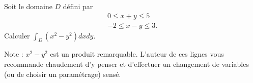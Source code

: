 
\begin{exercice}\label{exoOutilsMath-0142}

    Soit le domaine \( D\) défini par
    \begin{subequations}
        \begin{align}
            0\leq x+y\leq 5\\
            -2\leq x-y\leq 3.
        \end{align}
    \end{subequations}
    Calculer \( \int_D(x^2-y^2)dxdy\).

    Note : \( x^2-y^2\) est un produit remarquable. L'auteur de ces lignes vous recommande chaudement d'y penser et d'effectuer un changement de variables (ou de choisir un paramétrage) sensé.
    

\end{exercice}
